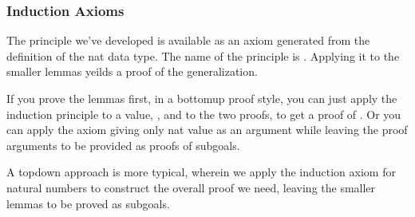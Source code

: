 \documentclass[letterpaper,10pt,english]{sphinxmanual}
\begin{document}
\subsubsection{Induction Axioms}
\label{\detokenize{A_03_Recursive_Types:induction-axioms}}
\sphinxAtStartPar
The principle we’ve developed is available as an axiom
generated from the definition of the nat data type. The
name of the principle is . Applying it to the
smaller lemmas yeilds a proof of the generalization.

\sphinxAtStartPar
If you prove the lemmas first, in a bottom\sphinxhyphen{}up proof style,
you can just apply the induction principle to a value, ,
and to the two proofs, to get a proof of . Or you can
apply the axiom giving only nat value as an argument while
leaving the proof arguments to be provided as proofs of
subgoals.

\begin{sphinxVerbatim}[commandchars=\\\{\}]
 
\end{sphinxVerbatim}

\sphinxAtStartPar
A top\sphinxhyphen{}down approach is more typical, wherein we apply the
induction axiom for natural numbers to construct the overall
proof we need, leaving the smaller lemmas to be proved as
subgoals.

\begin{sphinxVerbatim}[commandchars=\\\{\}]
      
 
 
  
     
    

      
 
 
     
               
 \PYG{o}{[}\PYG{o}{]}
\end{sphinxVerbatim}
\end{document}
